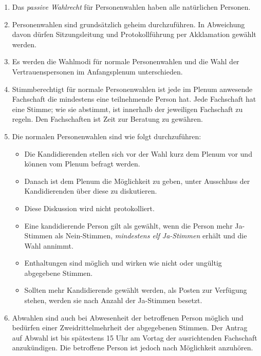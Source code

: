 \documentclass[
  a4paper,
  oneside]{scrartcl}
\providecommand{\tightlist}{%
  \setlength{\itemsep}{0pt}\setlength{\parskip}{0pt}}
\begin{document}
\begin{enumerate}
\def\labelenumi{\arabic{enumi}.}
\tightlist
\item
  Das \emph{passive Wahlrecht} für Personenwahlen haben alle natürlichen
  Personen.
\item
  Personenwahlen sind grundsätzlich geheim durchzuführen. In Abweichung
  davon dürfen Sitzungsleitung und Protokollführung per Akklamation
  gewählt werden.
\item
  Es werden die Wahlmodi für normale Personenwahlen und die Wahl der
  Vertrauenspersonen im Anfangsplenum unterschieden.
\item
  Stimmberechtigt für normale Personenwahlen ist jede im Plenum
  anwesende Fachschaft die mindestens eine teilnehmende Person hat. Jede
  Fachschaft hat eine Stimme; wie sie abstimmt, ist innerhalb der
  jeweiligen Fachschaft zu regeln. Den Fachschaften ist Zeit zur
  Beratung zu gewähren.
\item
  Die normalen Personenwahlen sind wie folgt durchzuführen:

  \begin{itemize}
  \tightlist
  \item
    Die Kandidierenden stellen sich vor der Wahl kurz dem Plenum vor und
    können vom Plenum befragt werden.
  \item
    Danach ist dem Plenum die Möglichkeit zu geben, unter Ausschluss der
    Kandidierenden über diese zu diskutieren.
  \item
    Diese Diskussion wird nicht protokolliert.
  \item
    Eine kandidierende Person gilt als gewählt, wenn die Person mehr
    Ja-Stimmen als Nein-Stimmen, \emph{mindestens elf Ja-Stimmen} erhält
    und die Wahl annimmt.
  \item
    Enthaltungen sind möglich und wirken wie nicht oder ungültig
    abgegebene Stimmen.
  \item
    Sollten mehr Kandidierende gewählt werden, als Posten zur Verfügung
    stehen, werden sie nach Anzahl der Ja-Stimmen besetzt.
  \end{itemize}
\item
  Abwahlen sind auch bei Abwesenheit der betroffenen Person möglich und
  bedürfen einer Zweidrittelmehrheit der abgegebenen Stimmen. Der Antrag
  auf Abwahl ist bis spätestens 15 Uhr am Vortag der ausrichtenden
  Fachschaft anzukündigen. Die betroffene Person ist jedoch nach
  Möglichkeit anzuhören.
\end{enumerate}
\end{document}
